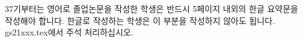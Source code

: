 \begin{summary}
37기부터는 영어로 졸업논문을 작성한 학생은 반드시 5페이지 내외의 한글 요약문을 작성해야 합니다. 한글로 작성하는 학생은 이 부분을 작성하지 않아도 됩니다. gs21xxx.tex에서 주석 처리하십시오.
\end{summary}
